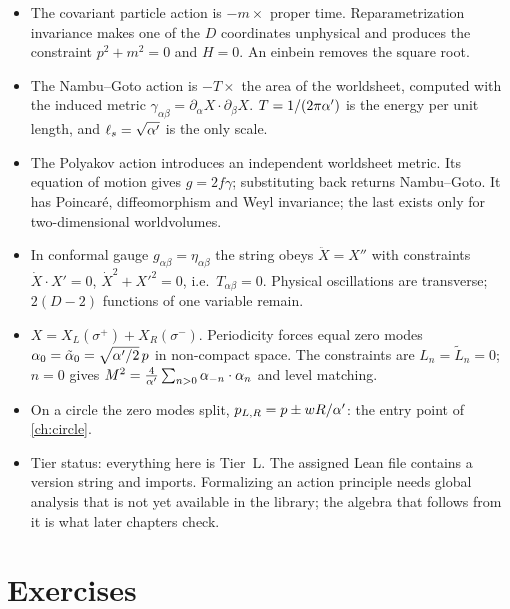 \begin{summarybox}
\begin{itemize}[nosep,leftmargin=*]
\item The covariant particle action is $-m\times$ proper time. Reparametrization invariance
makes one of the $D$ coordinates unphysical and produces the constraint $p^2+m^2=0$ and
$H=0$. An einbein removes the square root.
\item The Nambu--Goto action is $-T\times$ the area of the worldsheet, computed with the
induced metric $\gamma_{\alpha\beta}=\partial_\alpha X\cdot\partial_\beta X$. $T=1/(2\pi\alpha')$
is the energy per unit length, and $\ell_s=\sqrt{\alpha'}$ is the only scale.
\item The Polyakov action introduces an independent worldsheet metric. Its equation of
motion gives $g=2f\gamma$; substituting back returns Nambu--Goto. It has Poincar\'e,
diffeomorphism and Weyl invariance; the last exists only for two-dimensional worldvolumes.
\item In conformal gauge $g_{\alpha\beta}=\eta_{\alpha\beta}$ the string obeys
$\ddot X=X''$ with constraints $\dot X\cdot X'=0$, $\dot X^2+X'^2=0$, i.e.\ $T_{\alpha\beta}=0$.
Physical oscillations are transverse; $2(D-2)$ functions of one variable remain.
\item $X=X_L(\sigma^+)+X_R(\sigma^-)$. Periodicity forces equal zero modes
$\alpha_0=\tilde\alpha_0=\sqrt{\alpha'/2}\,p$ in non-compact space. The constraints are
$L_n=\tilde L_n=0$; $n=0$ gives $M^2=\frac4{\alpha'}\sum_{n>0}\alpha_{-n}\cdot\alpha_n$ and level
matching.
\item On a circle the zero modes split, $p_{L,R}=p\pm wR/\alpha'$: the entry point of
\cref{ch:circle}.
\item Tier status: everything here is Tier~L. The assigned Lean file contains a version
string and imports. Formalizing an action principle needs global analysis that is not yet
available in the library; the algebra that follows from it is what later chapters check.
\end{itemize}
\end{summarybox}

\section*{Exercises}

